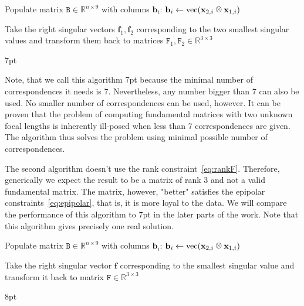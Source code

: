 \begin{algorithm}[H]
\SetAlgoLined 
\LinesNotNumbered
 \Begin
    {Populate matrix $\mathtt{B} \in \mathbb{R}^{n \times 9}$ with columns $\mathbf{b}_i$:  $\mathbf{b}_i \leftarrow  \vect(\mathbf{x}_{2,i} \kronecker \mathbf{x}_{1,i})$\; 
    
    Take the right singular vectors $\mathbf{f}_1, \mathbf{f}_2$ corresponding to the two smallest singular values and transform them back to matrices $\mathtt{F}_1, \mathtt{F}_2 \in \mathbb{R}^{3 \times 3}$ \;
    
    }
 \caption{7pt}
 \label{7pt}
\end{algorithm}

Note, that we call this algorithm 7pt because the minimal number of correspondences it needs is 7. Nevertheless, any  number bigger than 7 can also be used. No smaller number of correspondences can be used, however. It can be proven that the problem  of computing fundamental matrices  with two unknown focal lengths is inherently ill-posed when less than 7 correspondences are given. The algorithm thus solves the problem using minimal possible number of correspondences.

The second algorithm doesn't use the rank constraint~\ref{eq:rankF}. Therefore, generically we expect the result to be a matrix of rank 3 and not a valid fundamental matrix. The matrix, however, "better" satisfies the epipolar constraints~\ref{eq:epipolar}, that is, it is more loyal to the data. We will compare the performance of this algorithm to 7pt in the later parts of the work. Note that this algorithm gives precisely one real solution.

\begin{algorithm}[H]
\SetAlgoLined 
\LinesNotNumbered
 \Begin
    {Populate matrix $\mathtt{B} \in \mathbb{R}^{n \times 9}$ with columns $\mathbf{b}_i$:  $\mathbf{b}_i \leftarrow  \vect(\mathbf{x}_{2,i} \kronecker \mathbf{x}_{1,i})$\;
    
    Take the right singular vector $\mathbf{f}$ corresponding to the smallest singular value and transform it back to matrix $\mathtt{F} \in \mathbb{R}^{3 \times 3}$ \;
    
    }
 \caption{8pt}
 \label{8pt}
\end{algorithm}

